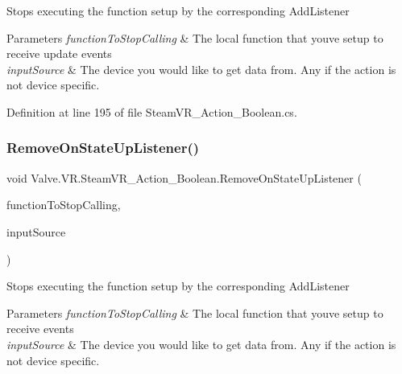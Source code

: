 Stops executing the function setup by the corresponding Add\+Listener 


\begin{DoxyParams}{Parameters}
{\em function\+To\+Stop\+Calling} & The local function that you\textquotesingle{}ve setup to receive update events\\
\hline
{\em input\+Source} & The device you would like to get data from. Any if the action is not device specific.\\
\hline
\end{DoxyParams}


Definition at line 195 of file Steam\+V\+R\+\_\+\+Action\+\_\+\+Boolean.\+cs.

\mbox{\label{class_valve_1_1_v_r_1_1_steam_v_r___action___boolean_a4d1c65c46143ef782e438f4d80150efc}} 
\subsubsection{\texorpdfstring{RemoveOnStateUpListener()}{RemoveOnStateUpListener()}}
{\footnotesize\ttfamily void Valve.\+V\+R.\+Steam\+V\+R\+\_\+\+Action\+\_\+\+Boolean.\+Remove\+On\+State\+Up\+Listener (\begin{DoxyParamCaption}\item[{\mbox{\hyperlink{class_valve_1_1_v_r_1_1_steam_v_r___action___boolean_a87ebada25dac6016557c3b81e6324b90}{State\+Up\+Handler}}}]{function\+To\+Stop\+Calling,  }\item[{\mbox{\hyperlink{namespace_valve_1_1_v_r_a82e5bf501cc3aa155444ee3f0662853f}{Steam\+V\+R\+\_\+\+Input\+\_\+\+Sources}}}]{input\+Source }\end{DoxyParamCaption})}



Stops executing the function setup by the corresponding Add\+Listener 


\begin{DoxyParams}{Parameters}
{\em function\+To\+Stop\+Calling} & The local function that you\textquotesingle{}ve setup to receive events\\
\hline
{\em input\+Source} & The device you would like to get data from. Any if the action is not device specific.\\
\hline
\end{DoxyParams}


